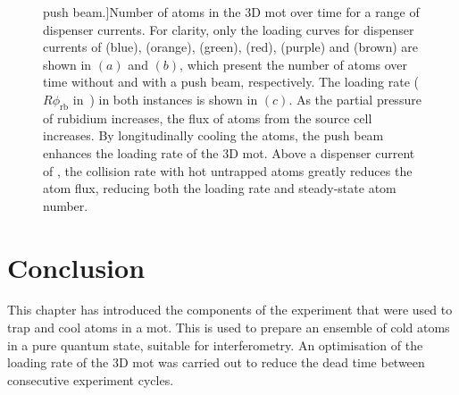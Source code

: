 \begin{figure}[!htbp]
		push beam.]{Number of atoms in the 3D \ac{mot} over time for a range of
		dispenser currents. For clarity, only the loading curves for dispenser
		currents of
		 (blue),
		(orange),  (green),  (red),
		 (purple) and  (brown) are
		shown in \((a)\) and \((b)\), which present the number of atoms over
		time without and with a push beam, respectively. The loading rate (\(R
		\phi_\text{rb}\) in~) in both instances is
		shown in \((c)\). As the partial pressure of rubidium increases, the
		flux of atoms from the source cell increases. By longitudinally cooling
		the atoms, the push beam enhances the loading rate of the 3D \ac{mot}.
		Above a dispenser current of
		, the collision rate with hot untrapped atoms greatly reduces the atom flux, reducing both the loading rate and steady-state atom number.}
	\label{fig:loading_plots}
\end{figure}

\section{Conclusion}
This chapter has introduced the components of the experiment that were used to
trap and cool atoms in a \ac{mot}. This is used to prepare an ensemble of cold
atoms in a pure quantum state, suitable for interferometry. An optimisation of
the loading rate of the 3D \ac{mot} was carried out to reduce the dead time
between consecutive experiment cycles. 